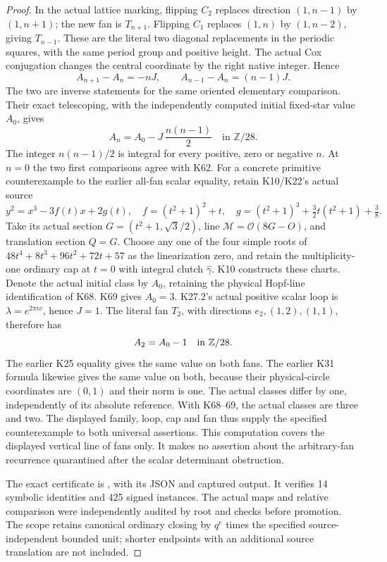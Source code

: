 \begin{proof}
In the actual lattice marking, flipping \(C_2\)
replaces direction \((1,n-1)\) by \((1,n+1)\);
the new fan is \(T_{n+1}\). Flipping \(C_1\)
replaces \((1,n)\) by \((1,n-2)\), giving
\(T_{n-1}\). These are the literal two diagonal
replacements in the periodic squares, with the
same period group and positive height.
The actual Cox conjugation changes the central
coordinate by the right native integer. Hence
\[
 A_{n+1}-A_n=-nJ,\qquad
 A_{n-1}-A_n=(n-1)J.                                \tag{SV.15}
\]
The two are inverse statements for the same
oriented elementary comparison. Their exact
telescoping, with the independently computed
initial fixed-star value \(A_0\), gives
\[
                   A_n=A_0-J\,\frac{n(n-1)}2
                          \quad\text{in }\mathbb Z/28.
                                                        \tag{SV.16}
\]
The integer \(n(n-1)/2\) is integral for every
positive, zero or negative \(n\). At \(n=0\)
the two first comparisons agree with K62.
For a concrete primitive counterexample to the earlier all-fan
scalar equality, retain K10/K22's actual source
\[
 y^2=x^3-3f(t)x+2g(t),\quad
 f=(t^2+1)^2+t,\quad
 g=(t^2+1)^3+\tfrac32t(t^2+1)+\tfrac38.
\]
Take its actual section \(G=(t^2+1,\sqrt3/2)\), line
\(\mathcal M=\mathcal O(8G-O)\), and translation section \(Q=G\).
Choose any one of the four simple roots of
\(48t^4+8t^3+96t^2+72t+57\) as the linearization zero,
and retain the multiplicity-one ordinary cap at \(t=0\)
with integral clutch \(\widehat\gamma\). K10 constructs
these charts. Denote the actual initial class by \(A_0\), retaining
the physical Hopf-line identification of K68. K69 gives \(A_0=3\). K27.2's actual positive
scalar loop is \(\lambda=e^{2\pi i v}\), hence \(J=1\).
The literal fan \(T_2\), with directions
\(e_2,(1,2),(1,1)\), therefore has
\[
                  A_2=A_0-1\quad\hbox{in }\mathbb Z/28.
\]
The earlier K25 equality gives the same value on both fans.
The earlier K31 formula likewise gives the same value on both,
because their physical-circle coordinates are \((0,1)\) and their
norm is one. The actual classes differ by one, independently
of its absolute reference. With K68--69, the actual classes are three and two.
The displayed family, loop, cap and fan thus supply the
specified counterexample to both universal assertions.
This computation covers the displayed vertical
line of fans only. It makes no assertion about
the arbitrary-fan recurrence quarantined after
the scalar determinant obstruction.

The exact certificate is , with its
JSON and captured output. It verifies 14 symbolic identities and 425
signed instances. The actual maps and relative comparison were independently
audited by root and checks before promotion. The scope retains canonical
ordinary closing by \(q^e\) times the specified source-independent bounded unit;
shorter endpoints with an additional source translation are not included.
\end{proof}
